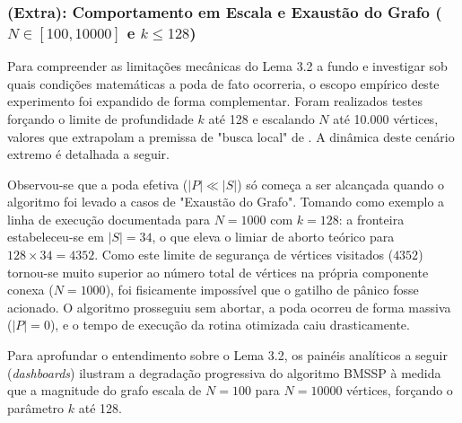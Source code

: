 \documentclass[10pt,a4paper]{article}
\begin{document}
\subsubsection{(Extra): Comportamento em Escala e Exaustão do Grafo ($N \in [100, 10000]$ e $k \le 128$)}

Para compreender as limitações mecânicas do Lema 3.2 a fundo e investigar sob quais condições matemáticas a poda de fato ocorreria, o escopo empírico deste experimento foi expandido de forma complementar. Foram realizados testes forçando o limite de profundidade $k$ até 128 e escalando $N$ até 10.000 vértices, valores que extrapolam a premissa de "busca local" de \citep{breakingTheSortingBarrier}. A dinâmica deste cenário extremo é detalhada a seguir.



Observou-se que a poda efetiva ($|P| \ll |S|$) só começa a ser alcançada quando o algoritmo foi levado a casos de "Exaustão do Grafo". Tomando como exemplo a linha de execução documentada para $N=1000$ com $k=128$: a fronteira estabeleceu-se em $|S|=34$, o que eleva o limiar de aborto teórico para $128 \times 34 = 4352$. Como este limite de segurança de vértices visitados ($4352$) tornou-se muito superior ao número total de vértices na própria componente conexa ($N=1000$), foi fisicamente impossível que o gatilho de pânico fosse acionado. O algoritmo prosseguiu sem abortar, a poda ocorreu de forma massiva ($|P| = 0$), e o tempo de execução da rotina otimizada caiu drasticamente.

Para aprofundar o entendimento sobre o Lema 3.2, os painéis analíticos a seguir (\textit{dashboards}) ilustram a degradação progressiva do algoritmo BMSSP à medida que a magnitude do grafo escala de $N=100$ para $N=10000$ vértices, forçando o parâmetro $k$ até 128.
\end{document}
